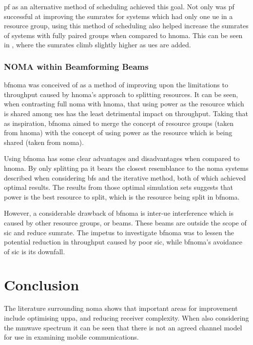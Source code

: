 \par
\ac{pf} as an alternative method of scheduling achieved this goal.
Not only was \ac{pf} successful at improving the sumrates for systems which had only one \ac{ue} in a resource group, using this method of scheduling also helped increase the sumrates of systems with fully paired groups when compared to \ac{hnoma}.
This can be seen in , where the sumrates climb slightly higher as \acp{ue} are added.

\subsubsection{NOMA within Beamforming Beams}
\ac{bfnoma} was conceived of as a method of improving upon the limitations to throughput caused by \ac{hnoma}'s approach to splitting resources.
It can be seen, when contrasting full \ac{noma} with \ac{hnoma}, that using power as the resource which is shared among \acp{ue} has the least detrimental impact on throughput.
Taking that as inspiration, \ac{bfnoma} aimed to merge the concept of resource groups (taken from \ac{hnoma}) with the concept of using power as the resource which is being shared (taken from \ac{noma}).

\par
Using \ac{bfnoma} has some clear advantages and disadvantages when compared to \ac{hnoma}.
By only splitting \ac{pa} it bears the closest resemblance to the \ac{noma} systems described when considering \ac{bfs} and the iterative method, both of which achieved optimal results.
The results from those optimal simulation sets suggests that power is the best resource to split, which is the resource being split in \ac{bfnoma}.

\par
However, a considerable drawback of \ac{bfnoma} is inter-\ac{ue} interference which is caused by other resource groups, or beams.
These beams are outside the scope of \ac{sic} and reduce sumrate.
The impetus to investigate \ac{bfnoma} was to lessen the potential reduction in throughput caused by poor \ac{sic}, while \ac{bfnoma}'s avoidance of \ac{sic} is its downfall.

\section{Conclusion}
The literature surrounding \ac{noma} shows that important areas for improvement include optimising \ac{uppa}, and reducing receiver complexity.
When also considering the \ac{mmwave} spectrum it can be seen that there is not an agreed channel model for use in examining mobile communications.

